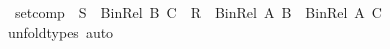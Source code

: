 \begin{isabellebody}
\ \ {\isachardoublequoteopen}set{\isacharunderscore}{\kern0pt}comp\ {\isacharcolon}{\kern0pt}\ {\isacharparenleft}{\kern0pt}S\ {\isacharcolon}{\kern0pt}\ Bin{\isacharunderscore}{\kern0pt}Rel\ B\ C{\isacharparenright}{\kern0pt}\ {\isasymRightarrow}\ {\isacharparenleft}{\kern0pt}R\ {\isacharcolon}{\kern0pt}\ Bin{\isacharunderscore}{\kern0pt}Rel\ A\ B{\isacharparenright}{\kern0pt}\ {\isasymRightarrow}\ Bin{\isacharunderscore}{\kern0pt}Rel\ A\ C{\isachardoublequoteclose}\isanewline
%
\isadelimproof
\ \ %
\endisadelimproof
%
\isatagproof
{}\isamarkupfalse%
\ unfold{\isacharunderscore}{\kern0pt}types\ auto%
\endisatagproof
{\isafoldproof}%
%
\isadelimproof
\isanewline
%
\endisadelimproof
\isanewline
%
\isadelimtheory
\isanewline
%
\endisadelimtheory
%
\isatagtheory
{}\isamarkupfalse%
%
\endisatagtheory
{\isafoldtheory}%
%
\isadelimtheory
%
\endisadelimtheory
%
\end{isabellebody}%
\endinput
